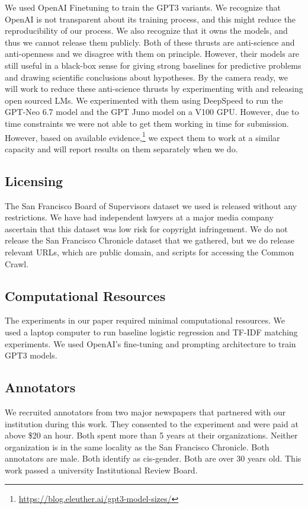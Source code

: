 \documentclass[11pt]{article}
\begin{document}
We used OpenAI Finetuning to train the GPT3 variants. We recognize that OpenAI is not transparent about its training process, and this might reduce the reproducibility of our process. We also recognize that it owns the models, and thus we cannot release them publicly. Both of these thrusts are anti-science and anti-openness and we disagree with them on principle. However, their models are still useful in a black-box sense for giving strong baselines for predictive problems and drawing scientific conclusions about hypotheses. By the camera ready, we will work to reduce these anti-science thrusts by experimenting with and releasing open sourced LMs. We experimented with them using DeepSpeed to run the GPT-Neo 6.7 model and the GPT Juno model on a V100 GPU. However, due to time constraints we were not able to get them working in time for submission. However, based on available evidence,\footnote{\url{https://blog.eleuther.ai/gpt3-model-sizes/}} we expect them to work at a similar capacity and will report results on them separately when we do.

\subsection{Licensing}

The San Francisco Board of Supervisors dataset we used is released without any restrictions. We have had independent lawyers at a major media company ascertain that this dataset was low risk for copyright infringement. We do not release the San Francisco Chronicle dataset that we gathered, but we do release relevant URLs, which are public domain, and scripts for accessing the Common Crawl.

\subsection{Computational Resources}

The experiments in our paper required minimal computational resources. We used a laptop computer to run baseline logistic regression and TF-IDF matching experiments. We used OpenAI's fine-tuning and prompting architecture to train GPT3 models.

\subsection{Annotators}

We recruited annotators from two major newspapers that partnered with our institution during this work. They consented to the experiment and were paid at above \$20 an hour. Both spent more than 5 years at their organizations. Neither organization is in the same locality as the San Francisco Chronicle. Both annotators are male. Both identify as cis-gender. Both are over 30 years old. This work passed a university Institutional Review Board.
\end{document}
